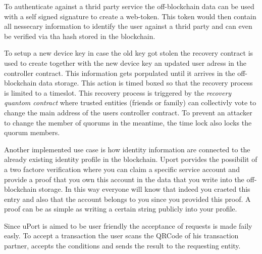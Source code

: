 To authenticate against a thrid party service the off-blockchain data can be used with a self signed signature to create a web-token. This token would then contain all nessecary information to identify the user against a thrid party and can even be verified via tha hash stored in the blockchain.

To setup a new device key in case the old key got stolen the recovery contract is used to create together with the new device key an updated user adress in the controller contract. This information gets porpulated until it arrives in the off-blockchain data storage. This action is timed boxed so that the recovery process is limited to a timeslot. This recovery process is triggered by the \textit{recovery quantom contract} where trusted entities (friends or family) can collectivly vote to change the main address of the users controller contract. To prevent an attacker to change the member of quorums in the meantime, the time lock also locks the quorum members.

Another implemented use case is how identity information are connected to the already existing identity profile in the blockchain. Uport porvides the possibilit of a two factore verification where you can claim a specific service account and provide a proof that you own this account in the data that you write into the off-blockchain storage. In this way everyone will know that indeed you craeted this entry and also that the account belongs to you since you provided this proof. A proof can be as simple as writing a certain string publicly into your profile. 

Since uPort is aimed to be user friendly the acceptance of requests is made faily easly. To accept a transaction the user scans the QRCode of his transaction partner, accepts the conditions and sends the result to the requesting entity.



